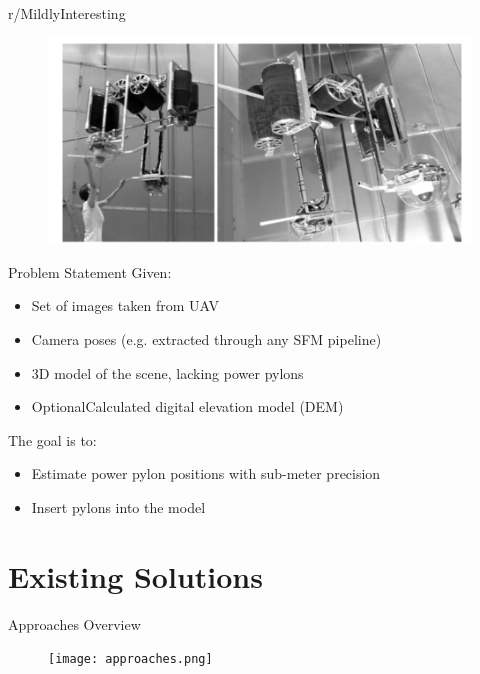 \documentclass{beamer}
\begin{document}
\begin{frame}[t, fragile]{r/MildlyInteresting}
\begin{figure}
\includegraphics[scale=0.33]{canuimagine}
\end{figure}
\end{frame}

\begin{frame}[t, fragile]{Problem Statement}
Given:
\begin{itemize}
\item Set of images taken from UAV
\item Camera poses (e.g. extracted through any SFM pipeline)
\item 3D model of the scene, lacking power pylons
\item \lbrack Optional\rbrack  Calculated digital elevation model (DEM)
\end{itemize}
The goal is to:
\begin{itemize}
\item Estimate power pylon positions with sub-meter precision
\item Insert pylons into the model
\end{itemize}
\end{frame}

\section{Existing Solutions}

\begin{frame}[t, fragile]{Approaches Overview}
\begin{figure}
\centering
\texttt{[image: approaches.png]}
\label{fig:line3d_output}
\end{figure}
\end{frame}
\end{document}
